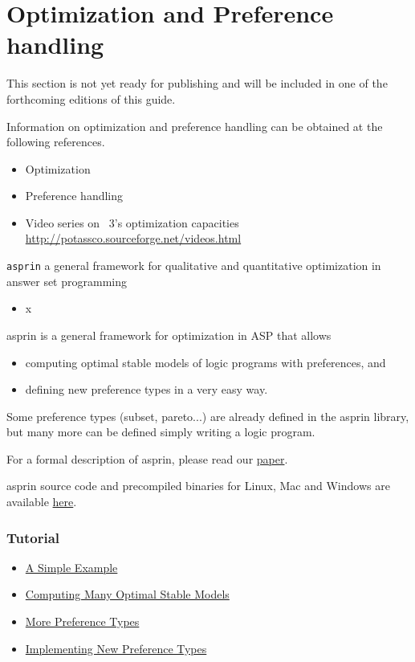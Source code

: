 
\section{Optimization and Preference handling}
\label{sec:prefopt}

This section is not yet ready for publishing
and will be included in one of the forthcoming editions of this guide.


Information on optimization and preference handling can be obtained at the following references.

\begin{itemize}
\item Optimization \cite{gekakasc11b,gekakasc11c,gekasc11b,ankamasc12a}
\item Preference handling \cite{brderosc14a,brderosc15a}
\item Video series on \clasp~3's optimization capacities \url{http://potassco.sourceforge.net/videos.html}
\end{itemize}

\iffalse

\texttt{asprin} a general framework for qualitative and quantitative optimization in answer set programming 
\begin{itemize}
	\item x %
\end{itemize}


asprin is a general framework for optimization in ASP that allows 
\begin{itemize}
	\item  computing optimal stable models of logic programs with preferences, and     
	\item  defining new preference types in a very easy way. 
\end{itemize}

Some preference types (subset, pareto...) are already defined in the asprin library, but many more can be defined  simply writing a logic program.  

 For a formal description of asprin, please read our \href{files/brderosc14a.pdf}{paper}. 

asprin source code and precompiled binaries for Linux, Mac and Windows are available  \href{https://sourceforge.net/projects/potassco/files/asprin}{here}.  

\subsubsection{Tutorial}
\begin{itemize}
	\item \hyperlink{example}{A Simple Example}
	\item \hyperlink{many}{Computing Many Optimal Stable Models}
	\item \hyperlink{more}{More Preference Types}
	\item \hyperlink{new}{Implementing New Preference Types}
\end{itemize}
% 
% 
% 

